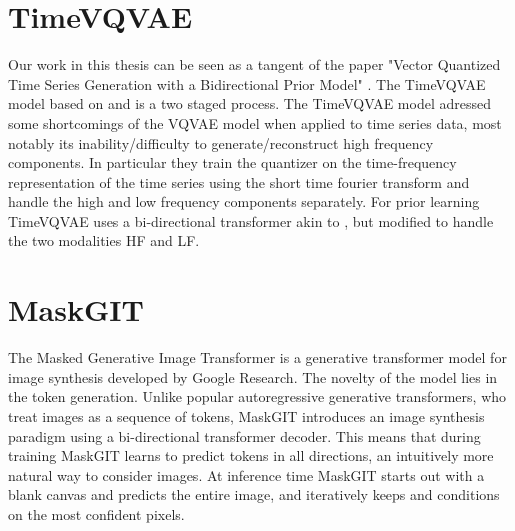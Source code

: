 \documentclass[../../thesis.tex]{subfiles}
\begin{document}





\section{TimeVQVAE}

Our work in this thesis can be seen as a tangent of the paper "Vector Quantized Time Series Generation with a Bidirectional Prior Model" \cite{TimeVQVAE}. The TimeVQVAE model based on \cite{VQVAE} and is a two staged process. The TimeVQVAE model adressed some shortcomings of the VQVAE model when applied to time series data, most notably its inability/difficulty to generate/reconstruct high frequency components. In particular they train the quantizer on the time-frequency representation of the time series using the short time fourier transform and handle the high and low frequency components separately. \newline
For prior learning TimeVQVAE uses a bi-directional transformer akin to \cite{chang2022maskgit}, but modified to handle the two modalities HF and LF.  \newline



\section{MaskGIT}

The Masked Generative Image Transformer is a generative transformer model for image synthesis developed by Google Research. The novelty of the model lies in the token generation. Unlike popular autoregressive generative transformers, who treat images as a sequence of tokens, MaskGIT introduces an image synthesis paradigm using a bi-directional transformer decoder. This means that during training MaskGIT learns to predict tokens in all directions, an intuitively more natural way to consider images. At inference time MaskGIT starts out with a blank canvas and predicts the entire image, and iteratively keeps and conditions on the most confident pixels.\newline

\end{document}
